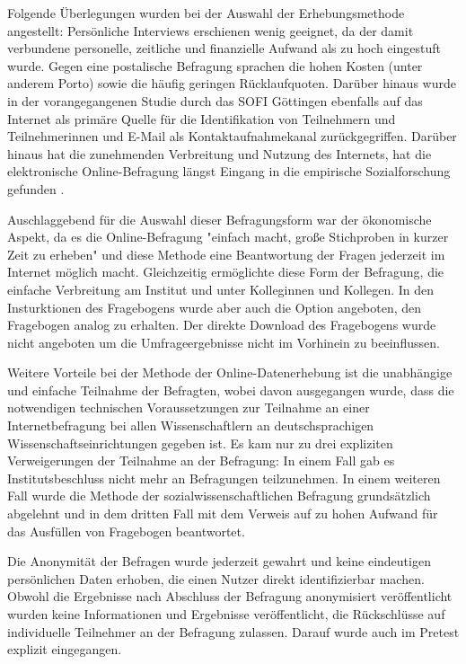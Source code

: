 Folgende Überlegungen wurden bei der Auswahl der Erhebungsmethode angestellt: Persönliche Interviews erschienen wenig geeignet, da der damit verbundene personelle, zeitliche und finanzielle Aufwand als zu hoch eingestuft wurde. Gegen eine postalische Befragung sprachen die hohen Kosten (unter anderem Porto) sowie die häufig geringen Rücklaufquoten. Darüber hinaus wurde in der vorangegangenen Studie durch das SOFI Göttingen ebenfalls auf das Internet als primäre Quelle für die Identifikation von Teilnehmern und Teilnehmerinnen und E-Mail als Kontaktaufnahmekanal zurückgegriffen. Darüber hinaus hat die zunehmenden Verbreitung und Nutzung des Internets, hat die elektronische Online-Befragung längst Eingang in die empirische Sozialforschung gefunden \cite{Pannewitz_2002}.

Auschlaggebend für die Auswahl dieser Befragungsform war der ökonomische Aspekt, da es die Online-Befragung "einfach macht, große Stichproben in kurzer Zeit zu erheben" \cite{eichhorn_2004_online} und diese Methode eine Beantwortung der Fragen jederzeit im Internet möglich macht. Gleichzeitig ermöglichte diese Form der Befragung, die einfache Verbreitung am Institut und unter Kolleginnen und Kollegen. In den Insturktionen des Fragebogens wurde aber auch die Option angeboten, den Fragebogen analog zu erhalten. Der direkte Download des Fragebogens wurde nicht angeboten um die Umfrageergebnisse nicht im Vorhinein zu beeinflussen.

Weitere Vorteile bei der Methode der Online-Datenerhebung ist die unabhängige und einfache Teilnahme der Befragten, wobei davon ausgegangen wurde, dass die notwendigen technischen Voraussetzungen zur Teilnahme an einer Internetbefragung bei allen Wissenschaftlern an deutschsprachigen Wissenschaftseinrichtungen gegeben ist. Es kam nur zu drei expliziten Verweigerungen der Teilnahme an der Befragung: In einem Fall gab es Institutsbeschluss nicht mehr an Befragungen teilzunehmen. In einem weiteren Fall wurde die Methode der sozialwissenschaftlichen Befragung grundsätzlich abgelehnt und in dem dritten Fall mit dem Verweis auf zu hohen Aufwand für das Ausfüllen von Fragebogen beantwortet.

Die Anonymität der Befragen wurde jederzeit gewahrt und keine eindeutigen persönlichen Daten erhoben, die einen Nutzer direkt identifizierbar machen. Obwohl die Ergebnisse nach Abschluss der Befragung anonymisiert veröffentlicht wurden keine Informationen und Ergebnisse veröffentlicht, die Rückschlüsse auf individuelle Teilnehmer an der Befragung zulassen. Darauf wurde auch im Pretest explizit eingegangen.

